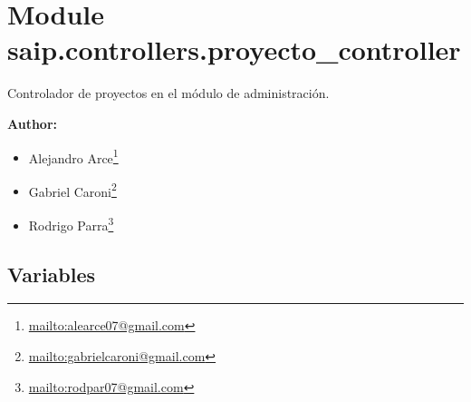 %
%
%


\section{Module saip.controllers.proyecto\_controller}

    \label{saip:controllers:proyecto_controller}
Controlador de proyectos en el módulo de administración.

\textbf{Author:} \begin{itemize}
\setlength{\parskip}{0.6ex}
  \item Alejandro 
    Arce\footnote{\href{mailto:alearce07@gmail.com}{mailto:alearce07@gmail.com}}

  \item Gabriel 
    Caroni\footnote{\href{mailto:gabrielcaroni@gmail.com}{mailto:gabrielcaroni@gmail.com}}

  \item Rodrigo 
    Parra\footnote{\href{mailto:rodpar07@gmail.com}{mailto:rodpar07@gmail.com}}

\end{itemize}





  \subsection{Variables}

